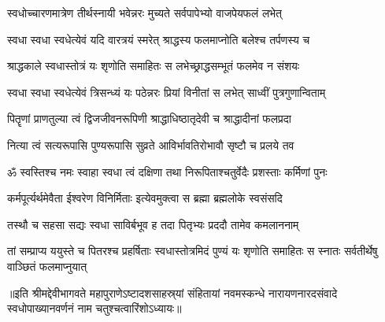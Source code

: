 
\addtocounter{shlokacount}{26}


\twolineshloka
{स्वधोच्चारणमात्रेण तीर्थस्नायी भवेन्नरः}
{मुच्यते सर्वपापेभ्यो वाजपेयफलं लभेत्} %

\twolineshloka
{स्वधा स्वधा स्वधेत्येवं यदि वारत्रयं स्मरेत्}
{श्राद्धस्य फलमाप्नोति बलेश्च तर्पणस्य च} %

\twolineshloka
{श्राद्धकाले स्वधास्तोत्रं यः शृणोति समाहितः}
{स लभेच्छ्राद्धसम्भूतं फलमेव न संशयः} %

\twolineshloka
{स्वधा स्वधा स्वधेत्येवं त्रिसन्ध्यं यः पठेन्नरः}
{प्रियां विनीतां स लभेत् साध्वीं पुत्रगुणान्विताम्} %

\twolineshloka
{पितॄणां प्राणतुल्या त्वं द्विजजीवनरूपिणी}
{श्राद्धाधिष्ठातृदेवी च श्राद्धादीनां फलप्रदा} %

\twolineshloka
{नित्या त्वं सत्यरूपासि पुण्यरूपासि सुव्रते}
{आविर्भावतिरोभावौ सृष्टौ च प्रलये तव} %

\twolineshloka
{ॐ स्वस्तिश्च नमः स्वाहा स्वधा त्वं दक्षिणा तथा}
{निरूपिताश्चतुर्वेदैः प्रशस्ताः कर्मिणां पुनः} %

\twolineshloka
{कर्मपूर्त्यर्थमेवैता ईश्वरेण विनिर्मिताः}
{इत्येवमुक्त्वा स ब्रह्मा ब्रह्मलोके स्वसंसदि} %

\twolineshloka
{तस्थौ च सहसा सद्यः स्वधा साविर्बभूव ह}
{तदा पितृभ्यः प्रददौ तामेव कमलाननाम्} %

\threelineshloka
{तां सम्प्राप्य ययुस्ते च पितरश्च प्रहर्षिताः}
{स्वधास्तोत्रमिदं पुण्यं यः शृणोति समाहितः}
{स स्नातः सर्वतीर्थेषु वाञ्छितं फलमाप्नुयात्} %

॥इति श्रीमद्देवीभागवते महापुराणेऽष्टादशसाहस्र्यां संहितायां नवमस्कन्धे नारायणनारदसंवादे स्वधोपाख्यानवर्णनं नाम चतुश्चत्वारिंशोऽध्यायः॥

\closesub
